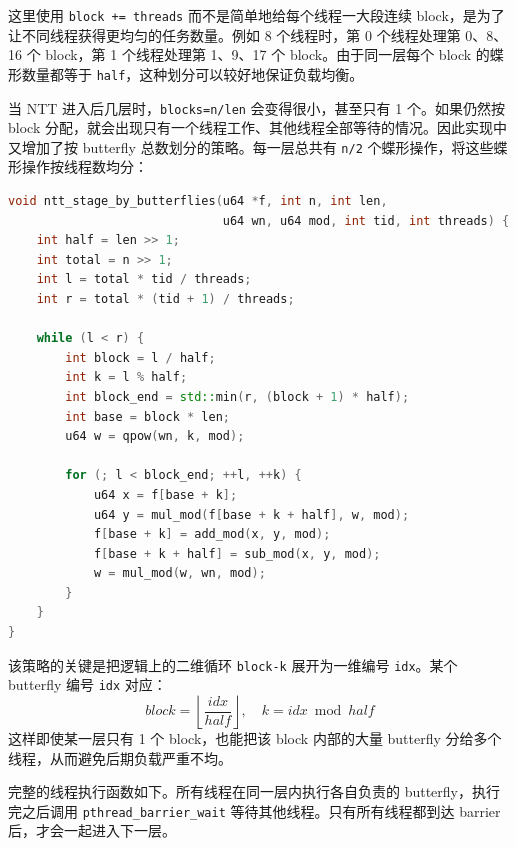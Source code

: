 \documentclass[a4paper]{article}
\begin{document}
这里使用 \texttt{block += threads} 而不是简单地给每个线程一大段连续 block，是为了让不同线程获得更均匀的任务数量。例如 8 个线程时，第 0 个线程处理第 0、8、16 个 block，第 1 个线程处理第 1、9、17 个 block。由于同一层每个 block 的蝶形数量都等于 \texttt{half}，这种划分可以较好地保证负载均衡。

当 NTT 进入后几层时，\texttt{blocks=n/len} 会变得很小，甚至只有 1 个。如果仍然按 block 分配，就会出现只有一个线程工作、其他线程全部等待的情况。因此实现中又增加了按 butterfly 总数划分的策略。每一层总共有 \texttt{n/2} 个蝶形操作，将这些蝶形操作按线程数均分：

\begin{lstlisting}[title=后期按 butterfly 数量划分,frame=trbl,language={C++}]
void ntt_stage_by_butterflies(u64 *f, int n, int len,
                              u64 wn, u64 mod, int tid, int threads) {
    int half = len >> 1;
    int total = n >> 1;
    int l = total * tid / threads;
    int r = total * (tid + 1) / threads;

    while (l < r) {
        int block = l / half;
        int k = l % half;
        int block_end = std::min(r, (block + 1) * half);
        int base = block * len;
        u64 w = qpow(wn, k, mod);

        for (; l < block_end; ++l, ++k) {
            u64 x = f[base + k];
            u64 y = mul_mod(f[base + k + half], w, mod);
            f[base + k] = add_mod(x, y, mod);
            f[base + k + half] = sub_mod(x, y, mod);
            w = mul_mod(w, wn, mod);
        }
    }
}
\end{lstlisting}

该策略的关键是把逻辑上的二维循环 \texttt{block-k} 展开为一维编号 \texttt{idx}。某个 butterfly 编号 \texttt{idx} 对应：
\[
block=\left\lfloor \frac{idx}{half}\right\rfloor,\quad k=idx\bmod half
\]
这样即使某一层只有 1 个 block，也能把该 block 内部的大量 butterfly 分给多个线程，从而避免后期负载严重不均。

完整的线程执行函数如下。所有线程在同一层内执行各自负责的 butterfly，执行完之后调用 \texttt{pthread\_barrier\_wait} 等待其他线程。只有所有线程都到达 barrier 后，才会一起进入下一层。
\end{document}
